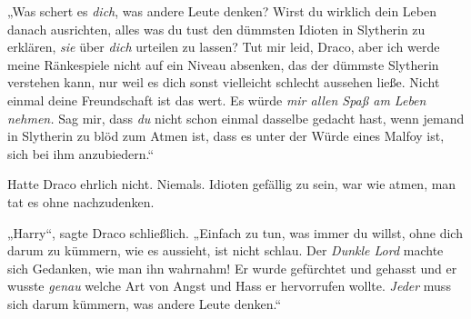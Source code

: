 „Was schert es \emph{dich}, was andere Leute denken? Wirst du wirklich dein Leben danach ausrichten, alles was du tust den dümmsten Idioten in Slytherin zu erklären, \emph{sie} über \emph{dich} urteilen zu lassen? Tut mir leid, Draco, aber ich werde meine Ränkespiele nicht auf ein Niveau absenken, das der dümmste Slytherin verstehen kann, nur weil es dich sonst vielleicht schlecht aussehen ließe. Nicht einmal deine Freundschaft ist das wert. Es würde \emph{mir allen Spaß am Leben nehmen.} Sag mir, dass \emph{du} nicht schon einmal dasselbe gedacht hast, wenn jemand in Slytherin zu blöd zum Atmen ist, dass es unter der Würde eines Malfoy ist, sich bei ihm anzubiedern.“

Hatte Draco ehrlich nicht. Niemals. Idioten gefällig zu sein, war wie atmen, man tat es ohne nachzudenken.

„Harry“, sagte Draco schließlich. „Einfach zu tun, was immer du willst, ohne dich darum zu kümmern, wie es aussieht, ist nicht schlau. Der \emph{Dunkle Lord} machte sich Gedanken, wie man ihn wahrnahm! Er wurde gefürchtet und gehasst und er wusste \emph{genau} welche Art von Angst und Hass er hervorrufen wollte. \emph{Jeder} muss sich darum kümmern, was andere Leute denken.“

